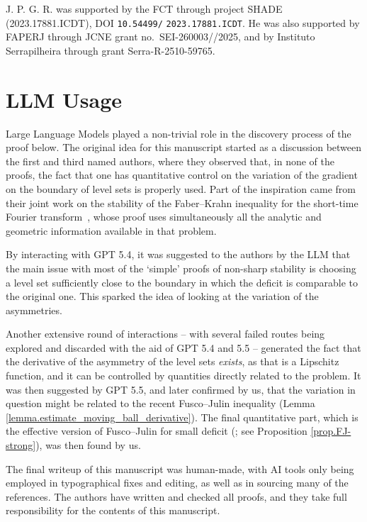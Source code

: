 \documentclass[11pt]{amsart}
\theoremstyle{plain}
\theoremstyle{definition}
\begin{document}
J. P. G. R.  was supported by the FCT through project SHADE
(2023.17881.ICDT), DOI \texttt{10.54499/}\allowbreak
\texttt{2023.17881.ICDT}. He was also supported  by FAPERJ through  JCNE grant
no.~SEI-260003//2025, and by Instituto Serrapilheira through
grant Serra-R-2510-59765.

\section*{LLM Usage}

Large Language Models played a non-trivial role in the discovery process of the proof below. The original idea for this manuscript started as a discussion between the first and third named authors, where they observed that, in none of the proofs, the fact that one has quantitative control on the variation of the gradient on the boundary of level sets is properly used. Part of the inspiration came from their joint work on the stability of the Faber--Krahn inequality for the short-time Fourier transform~\cite{GomezGuerraRamosTilli2024}, whose proof uses simultaneously all the analytic and geometric information available in that problem.

By interacting with GPT 5.4, it was suggested to the authors by the LLM that the main issue with most of the `simple' proofs of non-sharp stability is choosing a level set sufficiently close to the boundary in which the deficit is comparable to the original one. This sparked the idea of looking at the variation of the asymmetries. 

Another extensive round of interactions -- with several failed routes being explored and discarded with the aid of GPT 5.4 and 5.5 -- generated the fact that the derivative of the asymmetry of the level sets \emph{exists}, as that is a Lipschitz function, and it can be controlled by quantities directly related to the problem. It was then suggested by GPT 5.5, and later confirmed by us, that the variation in question might be related to the recent Fusco--Julin inequality (Lemma \ref{lemma.estimate_moving_ball_derivative}). The final quantitative part, which is the effective version of Fusco--Julin for small deficit (\cite{hensel2026quantitative}; see Proposition \ref{prop.FJ-strong}), was then found by us. 

The final writeup of this manuscript was human-made, with AI tools only being employed in typographical fixes and editing, as well as in sourcing many of the references. The authors have written and checked all proofs, and they take full responsibility for the contents of this manuscript.
\end{document}

